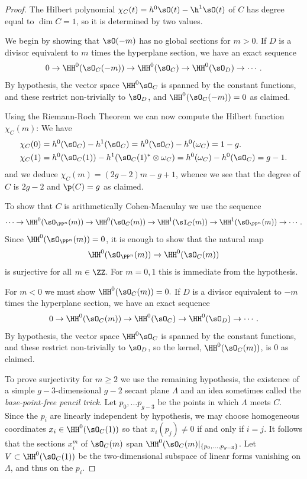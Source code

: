 \begin{proof} The Hilbert polynomial $\chi_{C}(t) = h^{0}\sO(t)-\h^{1}\sO(t)$ of $C$ has degree equal to
$\dim C = 1$, so it is determined by two values.

We begin by showing that $\sO(-m)$ has no global sections for $m>0$.
If $D$ is a divisor equivalent to $m$ times the hyperplane section, we have an exact sequence
$$
0\to \HH^{0}(\sO_{C}(-m)) \to \HH^{0}(\sO_{C}) \to \HH^{0}(\sO_{D}) \to \cdots.
$$
By hypothesis, the vector space $\HH^{0}\sO_{C}$ is spanned by the constant functions, and these
restrict non-trivially to $\sO_{D}$, and $\HH^{0}(\sO_{C}(-m)) = 0$ as claimed.

Using the Riemann-Roch Theorem we can now compute the Hilbert function $\chi_{C}(m)$:
We have 
\begin{align*}
 \chi_{C}(0) &= h^{0}(\sO_{C}) - h^{1}(\sO_{C}) = h^{0}(\sO_{C}) - h^{0}(\omega_{C}) = 1-g.\\
\chi_{C}(1) &= h^{0}(\sO_{C}(1)) - h^{1}(\sO_{C}(1)^{*}\otimes \omega_{C}) = h^{0}(\omega_{C}) - h^{0}(\sO_{C}) = g-1.
\end{align*}
and we deduce
$\chi_{C}(m) = (2g-2)m -g+1$, whence we see that the degree of $C$ is $2g-2$ and $\p(C) = g$ as claimed.

To show that
$C$ is arithmetically Cohen-Macaulay we use the sequence
$$
\cdots \to \HH^{0}(\sO_{\PP^{n}}(m)) \to \HH^{0}(\sO_{C}(m))
\to \HH^{1}(\sI_{C}(m))\to \HH^{1}(\sO_{\PP^{n}}(m)) \to\cdots .
$$
Since $\HH^{0}(\sO_{\PP^{n}}(m)) = 0$, it
is enough to show that the natural map 
$$
\HH^{0}(\sO_{\PP^{n}}(m)) \to \HH^{0}(\sO_{C}(m))
$$
 is surjective for all $m\in \ZZ$. For $m=0,1$ this is immediate from the hypothesis.

For $m <0$ we must show $\HH^{0}(\sO_{C}(m))=0.$ 
If $D$ is a divisor equivalent to $-m$ times the hyperplane section, we have an exact sequence
$$
0\to \HH^{0}(\sO_{C}(m)) 
\to \HH^{0}(\sO_{C}) 
\to \HH^{0}(\sO_{D}) \to \cdots.
$$
By hypothesis, the vector space $\HH^{0}\sO_{C}$ is spanned by the constant functions, and these
restrict non-trivially to $\sO_{D}$, so the kernel, $\HH^{0}(\sO_{C}(m))$, is 0 as claimed. 

To prove surjectivity for $m\geq 2$ we use the remaining hypothesis, the existence of
a simple $g-3$-dimensional $g-2$ secant plane $\Lambda$  and an idea sometimes called the \emph{base-point-free pencil trick}. Let $p_{0},\dots p_{g-3}$ be the points in which $\Lambda$ meets $C$.  Since the
$p_{i}$ are linearly independent by hypothesis, we may choose homogeneous coordinates $x_{i} \in \HH^{0}(\sO_{C}(1))$ so that
$x_{i}(p_{j}) \neq 0$ if and only if $i = j$. It follows that the sections
$x_{i}^{m}$ of $\sO_{C}(m)$ span $\HH^{0}(\sO_{C}(m)|_{\{p_{0}, \dots, p_{g-3}\}}$. Let 
$V\subset \HH^{0}(\sO_{C}(1))$ be the two-dimensional subspace of linear forms vanishing on
$\Lambda$, and thus on the $p_{i}$. 


\end{proof}
